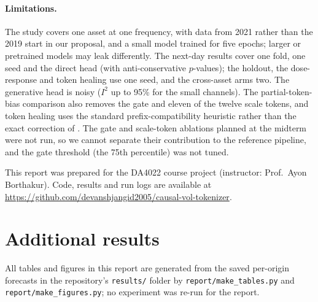 \documentclass{article}
\begin{document}
\paragraph{Limitations.}
The study covers one asset at one frequency, with data from 2021 rather than the 2019 start in our
proposal, and a small model trained for five epochs; larger or pretrained models may leak
differently. The next-day results cover one fold, one seed and the direct head (with
anti-conservative $p$-values); the holdout, the dose-response and token healing use one seed, and
the cross-asset arms two. The generative head is noisy ($I^2$ up to 95\% for the small channels).
The partial-token-bias comparison also removes the gate and eleven of the twelve scale tokens, and
token healing uses the standard prefix-compatibility heuristic rather than the exact correction of
\citet{phan2024tokenization}. The gate and scale-token ablations planned at the midterm were not
run, so we cannot separate their contribution to the reference pipeline, and the gate threshold
(the 75th percentile) was not tuned.

\begin{ack}
This report was prepared for the DA4022 course project (instructor: Prof.\ Ayon Borthakur). Code,
results and run logs are available at
\url{https://github.com/devanshjangid2005/causal-vol-tokenizer}.
\end{ack}

{\small


}

\appendix

\section{Additional results}
\label{app:extra}

All tables and figures in this report are generated from the saved per-origin forecasts in the
repository's \texttt{results/} folder by \texttt{report/make\_tables.py} and
\texttt{report/make\_figures.py}; no experiment was re-run for the report.

\begin{table}[h]
  \caption{Full robust statistics at $H=12$, Folds 1--6 (26,290 origins, losses averaged over seeds
  0--2 per origin). Holm correction is applied within each family (families are separated by the
  rule); RE is the DerSimonian--Laird random-effects estimate across folds with its 95\% interval.}
  \label{tab:robust}
  \centering
  \small
  
\end{table}
\end{document}
